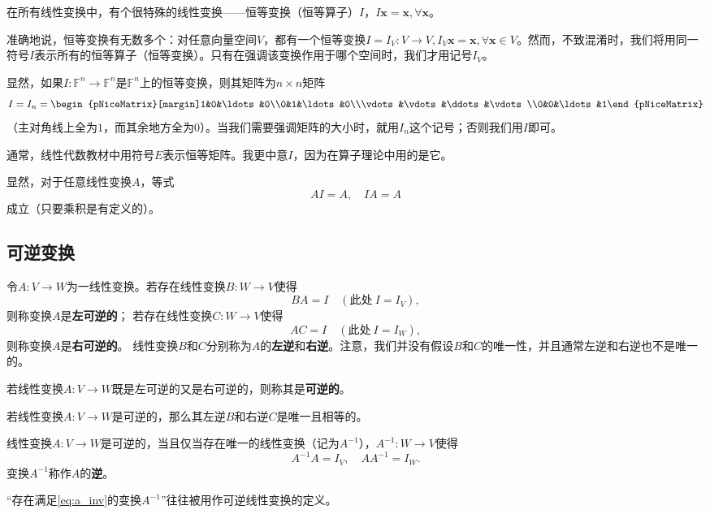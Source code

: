 在所有线性变换中，有个很特殊的线性变换——恒等变换（恒等算子）$I$，$I\mathbf{x}=\mathbf{x},\forall\mathbf{x}$。

准确地说，恒等变换有无数多个：对任意向量空间$V$，都有一个恒等变换$I=I_{V}:V\to V,I_{V}\mathbf{x}=\mathbf{x},\forall\mathbf{x}\in V$。然而，不致混淆时，我们将用同一符号$I$表示所有的恒等算子（恒等变换）。只有在强调该变换作用于哪个空间时，我们才用记号$I_V$。

显然，如果$I:\mathbb{F}^n\to\mathbb{F}^n$是$\mathbb{F}^n$上的恒等变换，则其矩阵为$n\times n$矩阵\[I=I_n=\begin{pNiceMatrix}[margin]1&0&\ldots&0\\0&1&\ldots&0\\\vdots&\vdots&\ddots&\vdots\\0&0&\ldots&1\end{pNiceMatrix}\]
（主对角线上全为$1$，而其余地方全为$0$）。当我们需要强调矩阵的大小时，就用$I_n$这个记号；否则我们用$I$即可。
\begin{remark*}
    通常，线性代数教材中用符号$E$表示恒等矩阵。我更中意$I$，因为在算子理论中用的是它。
\end{remark*}

显然，对于任意线性变换$A$，等式\[AI=A,\quad IA=A\]成立（只要乘积是有定义的）。

\subsection{可逆变换}

\begin{definition*}
    令$A:V\to W$为一线性变换。若存在线性变换$B:W\to V$使得\[BA=I\quad(\text{此处}~I=I_{V}),\]
    则称变换$A$是{\bf 左可逆的}；
    若存在线性变换$C:W\to V$使得\[AC=I\quad(\text{此处}~I=I_{W}),\]
    则称变换$A$是{\bf 右可逆的}。
    线性变换$B$和$C$分别称为$A$的{\bf 左逆}和{\bf 右逆}。注意，我们并没有假设$B$和$C$的唯一性，并且通常左逆和右逆也不是唯一的。
\end{definition*}

\begin{definition*}
    若线性变换$A:V\to W$既是左可逆的又是右可逆的，则称其是{\bf 可逆的}。
\end{definition*}

\begin{theorem}\label{thm:inverse_unique}
    若线性变换$A:V\to W$是可逆的，那么其左逆$B$和右逆$C$是唯一且相等的。
\end{theorem}

\begin{corollary*}
    线性变换$A:V\to W$是可逆的，当且仅当存在唯一的线性变换（记为$A^{-1}$），$A^{-1}:W\to V$使得
    \begin{equation}\label{eq:a_inv}
        A^{-1}A=I_V,\quad AA^{-1}=I_W.
    \end{equation}
    变换$A^{-1}$称作$A$的{\bf 逆}。
\end{corollary*}
\begin{remark*}
    “存在满足\eqref{eq:a_inv}的变换$A^{-1}$”往往被用作可逆线性变换的定义。
\end{remark*}

